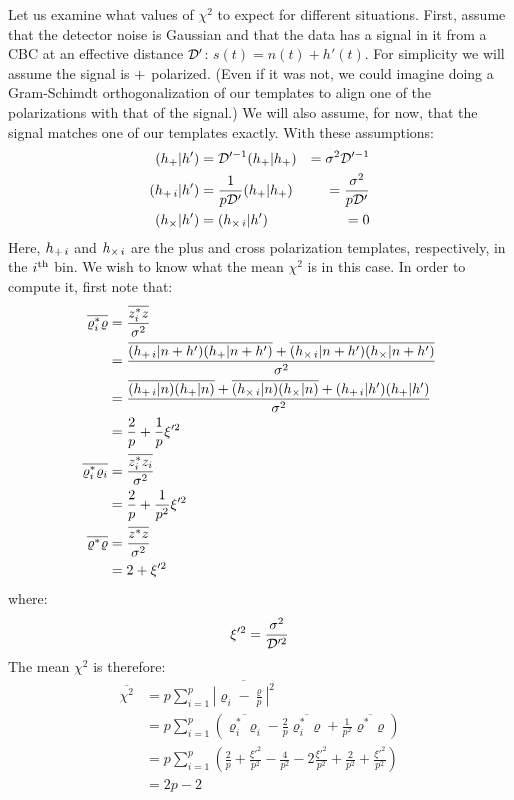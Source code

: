 Let us examine what values of $\chi^2$ to expect for different situations. First, assume that the detector noise is Gaussian and that the data has a signal in it from a \ac{CBC} at an effective distance $\mathcal{D}'$: $s(t) = n(t) + h'(t)$. For simplicity we will assume the signal is $+$ polarized. (Even if it was not, we could imagine doing a Gram-Schimdt orthogonalization of our templates to align one of the polarizations with that of the signal.) We will also assume, for now, that the signal matches one of our templates exactly. With these assumptions:
\begin{align}
(h_{+}|h') &= \mathcal{D}'^{-1} (h_{+}|h_{+}) &= \sigma^2\mathcal{D}'^{-1} \\
(h_{+\,i}|h') &= \frac{1}{p\mathcal{D}'}(h_{+}|h_{+}) &= \frac{\sigma^2}{p\mathcal{D}'} \\
(h_{\times}|h') &= (h_{\times\,i}|h') &= 0
\end{align}
Here, $h_{+\,i}$ and $h_{\times\,i}$ are the plus and cross polarization templates, respectively, in the $i^{\mathrm{th}}$ bin. We wish to know what the mean $\chi^2$ is in this case. In order to compute it, first note that:
\begin{align}
\overline{\varrho_i^{*}\varrho} &= \frac{\overline{z_i^*z}}{\sigma^2} \nonumber \\
    &= \frac{ \overline{ (h_{\pls \,i}|n+h')(h_{\pls}|n+h')} + \overline{(h_{\crs \,i}|n+h')(h_{\crs}|n+h') }}{\sigma^2} \nonumber \\
    &= \frac{ \overline{(h_{\pls\,i}|n)(h_\pls|n)} + \overline{(h_{\crs\,i}|n)(h_\crs|n)} + (h_{\pls\,i}|h')(h_{\pls}|h')}{\sigma^2} \nonumber \\
\label{eqn:rhoi_rho}
    &= \frac{2}{p} + \frac{1}{p}\xi'^2 \\
\overline{\varrho_i^{*}\varrho_i} &= \frac{\overline{z_i^*z_i}}{\sigma^2} \nonumber \\
\label{eqn:rhoi_rhoi}
    & = \frac{2}{p} + \frac{1}{p^2}\xi'^2 \\
\overline{\varrho^{*}\varrho} &= \frac{\overline{z^*z}}{\sigma^2} \nonumber \\
\label{eqn:rho_rho}
    &= 2 + \xi'^2
\end{align}
where:
\begin{equation}
\xi'^2 = \frac{\sigma^2}{\mathcal{D}'^2}
\end{equation}
The mean $\chi^2$ is therefore:
\begin{align}
\overline{\chi^2} &= p \sum_{i=1}^{p} \overline{\left| \varrho_i - \frac{\varrho}{p} \right|^2} \nonumber \\
 &= p \sum_{i=1}^{p} \left( \overline{ \varrho_i^*\varrho_i } - \frac{2}{p} \overline{\varrho_i^*\varrho} + \frac{1}{p^2}\overline{\varrho^*\varrho} \right) \nonumber \\
 &= p \sum_{i=1}^{p} \left( \frac{2}{p} + \frac{\xi'^2}{p^2} - \frac{4}{p^2} - 2 \frac{\xi'^2}{p^2} + \frac{2}{p^2} + \frac{\xi'^2}{p^2} \right) \\
\label{eqn:mean_chisq}
 &= 2p - 2
\end{align}
